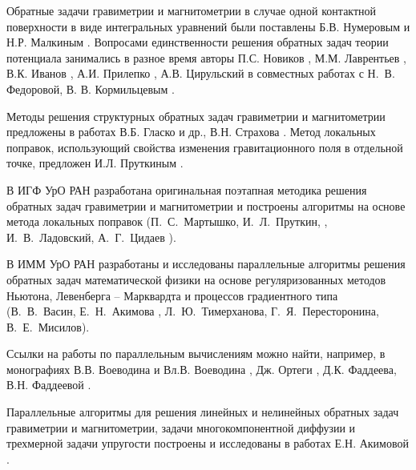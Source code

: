 {Обратные задачи гравиметрии и магнитометрии в случае одной контактной поверхности в виде интегральных уравнений были поставлены Б.В. Нумеровым и Н.Р. Малкиным \cite{Num1930, Mal1931}. Вопросами единственности решения обратных задач теории потенциала занимались в разное время авторы П.С. Новиков \cite{Nov1938}, М.М. Лаврентьев \cite{Lavr1956}, В.К. Иванов \cite{Iv1962_1}, А.И. Прилепко \cite{Pri1965}, А.В. Цирульский в совместных работах с Н.~В.~ Федоровой, В. В. Кормильцевым \cite{FedTsi1976,TsiKor1990}.

Методы решения структурных обратных задач гравиметрии и магнитометрии предложены в работах В.Б. Гласко и др.\cite{GlaOstFil1970}, В.Н. Страхова \cite{Str1967,Str1969,Str1974_1,Str1974_2,Str1976}. Метод локальных поправок, использующий свойства изменения гравитационного поля в отдельной точке, предложен И.Л. Пруткиным \cite{Pru1983,Pru1986,Prutdiss1998}.

В ИГФ УрО РАН разработана оригинальная поэтапная методика решения обратных задач гравиметрии и магнитометрии  и построены  алгоритмы на основе метода локальных поправок (П.~С.~Мартышко, И.~Л.~Пруткин, \cite{MarPru1982,MarPrut2003}, И.~В.~Ладовский, А.~Г.~Цидаев \cite{MarLadTsi2010}).

В ИММ УрО РАН разработаны и исследованы параллельные алгоритмы решения обратных задач математической физики на основе регуляризованных методов Ньютона, Левенберга -- Марквардта и процессов градиентного типа (В.~В.~Васин, Е.~Н.~Акимова \cite{AkiVas2002,AkiVas2004}, Л.~Ю.~Тимерханова, Г.~Я.~Пересторонина, В.~Е.~Мисилов).

Ссылки на работы по параллельным вычислениям можно найти, например, в монографиях В.В. Воеводина и Вл.В. Воеводина \cite{VoeVoe2002}, Дж. Ортеги \cite{Ort1991}, Д.К. Фаддеева, В.Н. Фаддеевой \cite{FadFad1977}.

Параллельные алгоритмы для решения линейных и нелинейных обратных задач 
гравиметрии и магнитометрии, задачи многокомпонентной диффузии и трехмерной задачи упругости построены и исследованы в работах Е.Н. Акимовой \cite{Aki1994,Aki2001,AkiGorPop2005,Aki2009,Akidiss2009,AkiBel2011,AkiMisKos2015}.
}


